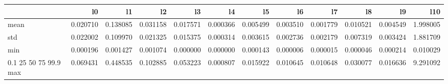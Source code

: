 \begin{tabular}{lrrrrrrrrrrr}
\toprule
 & l0 & l1 & l2 & l3 & l4 & l5 & l6 & l7 & l8 & l9 & l10 \\
\midrule
mean & 0.020710 & 0.138085 & 0.031158 & 0.017571 & 0.000366 & 0.005499 & 0.003510 & 0.001779 & 0.010521 & 0.004549 & 1.998005 \\
std & 0.022002 & 0.109970 & 0.021325 & 0.015375 & 0.000314 & 0.003615 & 0.002736 & 0.002179 & 0.007319 & 0.003424 & 1.881709 \\
min & 0.000196 & 0.001427 & 0.001074 & 0.000000 & 0.000000 & 0.000143 & 0.000006 & 0.000015 & 0.000046 & 0.000214 & 0.010029 \\
0.1%
25%
50%
75%
99.9%
max & 0.069431 & 0.448535 & 0.102885 & 0.053223 & 0.000807 & 0.015922 & 0.010645 & 0.010648 & 0.030077 & 0.016636 & 9.291092 \\
\bottomrule
\end{tabular}

